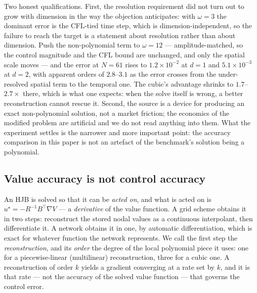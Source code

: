 \documentclass[conference]{IEEEtran}
\begin{document}
Two honest qualifications. First, the resolution requirement did not turn out to grow with dimension
in the way the objection anticipates: with $\omega = 3$ the dominant error is the CFL-tied time step,
which is dimension-independent, so the failure to reach the target is a statement about resolution
rather than about dimension. Push the non-polynomial term to $\omega = 12$ --- amplitude-matched, so
the control magnitude and the CFL bound are unchanged, and only the spatial scale moves --- and the
error at $N=61$ rises to $1.2\times10^{-2}$ at $d=1$ and $5.1\times10^{-3}$ at $d=2$, with apparent
orders of $2.8$--$3.1$ as the error crosses from the under-resolved spatial term to the temporal
one. The cubic's advantage shrinks to $1.7$--$2.7\times$ there, which is what one expects: when the
solve itself is wrong, a better reconstruction cannot rescue it. Second, the source is a device for
producing an exact non-polynomial solution, not a market friction; the economics of the modified
problem are artificial and we do not read anything into them. What the experiment settles is the
narrower and more important point: the accuracy comparison in this paper is not an artefact of the
benchmark's solution being a polynomial.



\subsection{Value accuracy is not control accuracy}\label{sec:control}

An HJB is solved so that it can be \emph{acted on}, and what is acted on is
$u^\star = -R^{-1}B^\top \nabla V$ --- a \emph{derivative} of the value function. A grid scheme
obtains it in two steps: reconstruct the stored nodal values as a continuous interpolant, then
differentiate it. A network obtains it in one, by automatic differentiation, which is exact for
whatever function the network represents. We call the first step the \emph{reconstruction}, and its
\emph{order} the degree of the local polynomial piece it uses: one for a piecewise-linear
(multilinear) reconstruction, three for a cubic one. A reconstruction of order $k$ yields a
gradient converging at a rate set by $k$, and it is that rate --- not the accuracy of the solved
value function --- that governs the control error.
\end{document}
